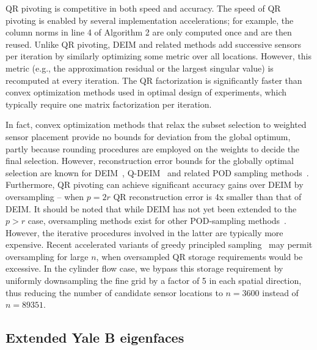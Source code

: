 \documentclass[letterpaper]{IEEEtran}
\begin{document}
	QR pivoting is competitive in both speed and accuracy. 
	The speed of QR pivoting is enabled by several implementation accelerations; for example, the column norms in line 4 of Algorithm 2 are only computed once and are then reused. 
	Unlike QR pivoting, DEIM and related methods add successive sensors per iteration by similarly optimizing some metric over all locations. 
	However, this metric (e.g., the approximation residual or the largest singular value) is recomputed at every iteration. 
	The QR factorization is significantly faster than convex optimization methods used in optimal design of experiments, which typically require one matrix factorization per iteration.

	In fact, convex optimization methods that relax the subset selection to weighted sensor placement provide no bounds for deviation from the global optimum, partly because rounding procedures are employed on the weights to decide the final selection. However, reconstruction error bounds for the globally optimal selection are known for DEIM~\cite{Chaturantabut2010siamjsc}, Q-DEIM~\cite{drmac2016siam} and related POD sampling methods~\cite{Willcox2006compfl,Yildirim2009oceanmod}. 
	Furthermore, QR pivoting can achieve significant accuracy gains over DEIM by oversampling -- when $p=2r$ QR reconstruction error is 4x smaller than that of DEIM. It should be noted that while DEIM has not yet been extended to the $p>r$ case, oversampling methods exist for other POD-sampling methods~\cite{Willcox2006compfl,Yildirim2009oceanmod}. 
	However, the iterative procedures involved in the latter are typically more expensive. 
	Recent accelerated variants of greedy principled sampling~\cite{Zimmermann2016siamjsc} may permit oversampling for large $n$, when oversampled QR storage requirements would be excessive. 
	In the cylinder flow case, we bypass this storage requirement by uniformly downsampling the fine grid by a factor of 5 in each spatial direction, thus reducing the number of candidate sensor locations to $n=3600$ instead of $n=89351$.
	
\subsection{Extended Yale B eigenfaces}\label{Sec:Results:Eigenfaces}
\end{document}

